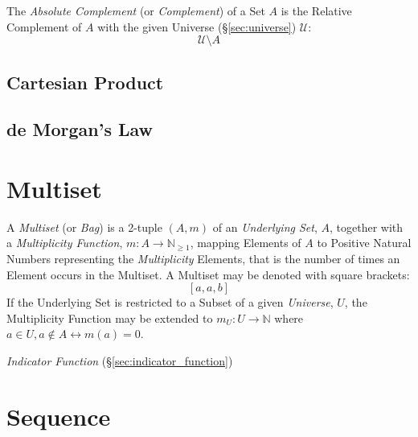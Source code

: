 The \emph{Absolute Complement} (or \emph{Complement}) of a Set $A$ is
the Relative Complement of $A$ with the given Universe
(\S\ref{sec:universe}) $\mathcal{U}$:
\[
  \mathcal{U} \setminus A
\]



\subsection{Cartesian Product}\label{sec:cartesian_product}

\subsection{de Morgan's Law}\label{sec:de_morgan}



\section{Multiset}\label{sec:multiset}

A \emph{Multiset} (or \emph{Bag}) is a 2-tuple $(A,m)$ of an
\emph{Underlying Set}, $A$, together with a \emph{Multiplicity
  Function}, $m : A \rightarrow \mathbb{N}_{\geq 1}$, mapping Elements
of $A$ to Positive Natural Numbers representing the
\emph{Multiplicity} Elements, that is the number of times an Element
occurs in the Multiset. A Multiset may be denoted with square
brackets:
\[
  [a,a,b]
\]
If the Underlying Set is restricted to a Subset of a given
\emph{Universe}, $U$, the Multiplicity Function may be extended to
$m_U : U \rightarrow \mathbb{N}$ where $a \in U, a \notin A
\leftrightarrow m(a)=0$.

\emph{Indicator Function} (\S\ref{sec:indicator_function})



\section{Sequence}\label{sec:sequence}

